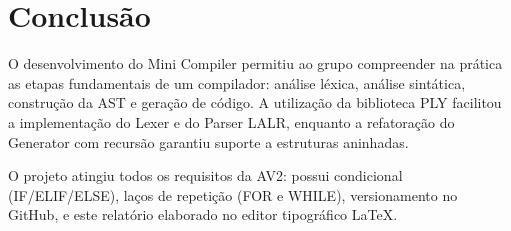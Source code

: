 \documentclass[12pt, a4paper]{article}
\begin{document}
\section{Conclusão}

O desenvolvimento do Mini Compiler permitiu ao grupo compreender na prática as etapas
fundamentais de um compilador: análise léxica, análise sintática, construção da AST e
geração de código. A utilização da biblioteca PLY facilitou a implementação do Lexer e
do Parser LALR, enquanto a refatoração do Generator com recursão garantiu suporte a
estruturas aninhadas.

O projeto atingiu todos os requisitos da AV2: possui condicional (IF/ELIF/ELSE),
laços de repetição (FOR e WHILE), versionamento no GitHub, e este relatório
elaborado no editor tipográfico \LaTeX{}.
\end{document}
